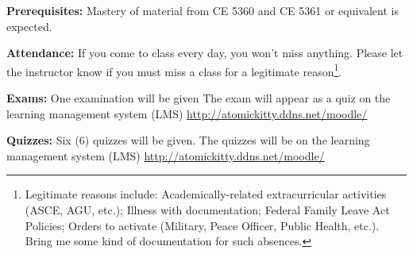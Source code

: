 \documentclass[12pt]{article}
\begin{document}
\textbf{Prerequisites:} 
Mastery of material from CE 5360 and CE 5361 or equivalent is expected.

\textbf{Attendance:} If you come to class every day, you won't miss anything.  Please let the instructor know if you must miss a class for a legitimate reason\footnote{Legitimate reasons include: Academically-related extracurricular activities (ASCE, AGU, etc.); Illness with documentation; Federal Family Leave Act Policies; Orders to activate (Military, Peace Officer, Public Health, etc.).  Bring me some kind of documentation for such absences.}. 

\textbf{Exams:} One examination will be given
The exam will appear as a quiz on the learning management system (LMS) \url{http://atomickitty.ddns.net/moodle/}

\textbf{Quizzes:} Six (6) quizzes will be given. The quizzes will be on the learning management system (LMS) \url{http://atomickitty.ddns.net/moodle/}%
\end{document}
